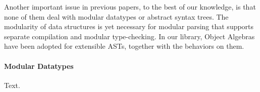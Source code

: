 Another important issue in previous papers, to the best of our knowledge, is that none of them deal with modular datatypes or abstract syntax trees.  The modularity of data structures is yet necessary for modular parsing that supports separate compilation and modular type-checking. In our library, Object Algebras have been adopted for extensible ASTs, together with the behaviors on them.

\paragraph*{Modular Datatypes} Text.
